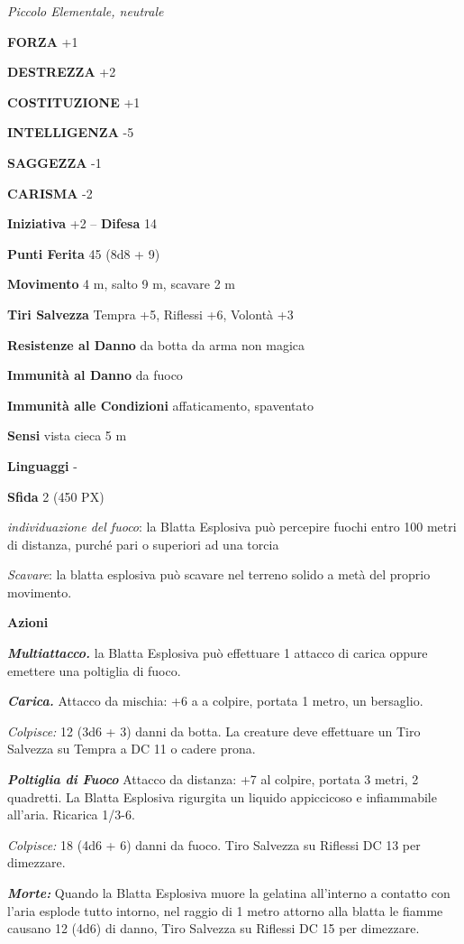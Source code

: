 \begin{multicols}{2}
	\textit{Piccolo Elementale, neutrale}

	\textbf{FORZA} +1

	\textbf{DESTREZZA} +2

	\textbf{COSTITUZIONE} +1

	\textbf{INTELLIGENZA} -5

	\textbf{SAGGEZZA} -1

	\textbf{CARISMA} -2

	\textbf{Iniziativa} +2 -- \textbf{Difesa} 14

	\textbf{Punti Ferita} 45 (8d8 + 9)

	\textbf{Movimento} 4 m, salto 9 m, scavare 2 m

	\textbf{Tiri Salvezza} Tempra +5, Riflessi +6, Volontà +3

	\textbf{Resistenze al Danno} da botta da arma non magica

	\textbf{Immunità al Danno} da fuoco

	\textbf{Immunità alle Condizioni} affaticamento, spaventato

	\textbf{Sensi} vista cieca 5 m

	\textbf{Linguaggi} -

	\textbf{Sfida} 2 (450 PX)

	\textit{individuazione del fuoco}: la Blatta Esplosiva può percepire fuochi entro 100 metri di distanza, purché pari o superiori ad una torcia

	\textit{Scavare}: la blatta esplosiva può scavare nel terreno solido a metà del proprio movimento.

	\textbf{Azioni}

	\textit{\textbf{Multiattacco.}} la Blatta Esplosiva può effettuare 1 attacco di carica oppure emettere una poltiglia di fuoco.

	\textit{\textbf{Carica.}} Attacco da mischia: +6 a a colpire, portata 1 metro, un bersaglio.

	\textit{Colpisce:} 12 (3d6 + 3) danni da botta. La creature deve effettuare un Tiro Salvezza su Tempra a DC 11 o cadere prona.

	\textit{\textbf{Poltiglia di Fuoco}} Attacco da distanza: +7 al colpire, portata 3 metri, 2 quadretti. La Blatta Esplosiva rigurgita un liquido appiccicoso e infiammabile all'aria. Ricarica 1/3-6.

	\textit{Colpisce:} 18 (4d6 + 6) danni da fuoco. Tiro Salvezza su Riflessi DC 13 per dimezzare.

	\textit{\textbf{Morte:}} Quando la Blatta Esplosiva muore la gelatina all'interno a contatto con l'aria esplode tutto intorno, nel raggio di 1 metro attorno alla blatta le fiamme causano 12 (4d6) di danno, Tiro Salvezza su Riflessi DC 15 per dimezzare.


\end{multicols}

